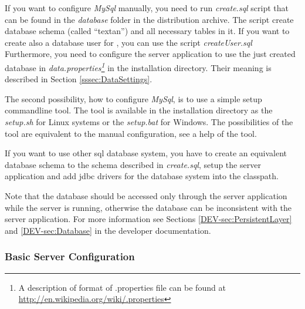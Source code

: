 If you want to configure \emph{MySql} manually, you need to run \emph{create.sql} script
that can be found in the \emph{database} folder in the distribution archive. The script
create database schema (called ``textan'') and all necessary  tables in it. If you
want to create also a database user for \textan{}, you can use the script \emph{createUser.sql}
Furthermore, you need to configure the server application to use the just created
database in \emph{data.properties\footnote{A description of format of .properties file can
be found at \url{http://en.wikipedia.org/wiki/.properties}}} in the installation directory.
Their meaning is described in Section \ref{sssec:DataSettings}.

The second possibility, how to configure \emph{MySql}, is to use a simple setup
commandline tool. The tool is available in the installation directory as
the \emph{setup.sh} for Linux systems or the \emph{setup.bat} for Windows.
The possibilities of the tool are equivalent to the manual configuration, see
a help of the tool.

If you want to use other sql database system, you have to create an equivalent
database schema to the schema described in \emph{create.sql}, setup the server
application and add jdbc drivers for the database system into the classpath.

Note that the database should be accessed only through the \textan{} server application
while the server is running, otherwise the database can be inconsistent with
the server application. For more information see Sections \ref{DEV-sec:PersistentLayer}
and \ref{DEV-sec:Database} in the developer documentation.

 

\subsubsection{Basic Server Configuration}

